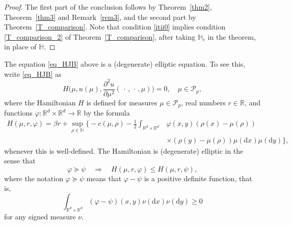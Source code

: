 \documentclass{article}
\theoremstyle{definition}
\newtheorem{remark}[theorem]{\textbf{Remark}}
\numberwithin{equation}{section}
\numberwithin{theorem}{section}
\newcommand{\R}{\mathbb{R}}
\newcommand{\dx}{\mathrm{d}x}
\newcommand{\dy}{\mathrm{d}y}
\newcommand{\Hb}{\mathbb{H}}
\newcommand{\Pcal}{{\mathcal P}}
\newcommand{\fdot}{{\,\cdot\,}}
\begin{document}
\begin{proof}
The first part of the conclusion follows by Theorem~\ref{thm2}, Theorem~\ref{thm3} and Remark~\ref{rem3}, and the second part by Theorem~\ref{T_comparison}. Note that condition \ref{itii0} implies condition \ref{T_comparison_2} of Theorem~\ref{T_comparison}, after taking $\Hb_c$ in the theorem, in place of $\Hb$.
\end{proof}



The equation \eqref{eq_HJB} above is a (degenerate) elliptic equation. To see this, write \eqref{eq_HJB} as
\[
H\Big(\mu,u(\mu),\frac{\partial^2 u}{\partial \mu^2}(\fdot,\fdot,\mu)\Big) = 0, \quad \mu\in\Pcal_p, 
\]
where the Hamiltonian $H$ is defined for measures $\mu\in\Pcal_p$, real numbers $r\in\R$, and functions $\varphi\colon {\R^d}\times {\R^d}\to\R$ by the formula
\begin{align*}
H(\mu,r,\varphi) = \beta r +  \sup_{\rho\in\Hb} \Big\{ - c(\mu,\rho) - \frac12 \int_{{\R^d}\times {\R^d}} & \varphi(x,y)(\rho(x) - \mu(\rho)) \\
&\times(\rho(y) - \mu(\rho)) \mu(\dx)\mu(\dy) \Big\},
\end{align*}
whenever this is well-defined. The Hamiltonian is (degenerate) elliptic in the sense that
\[
\varphi \succeq \psi \quad \Longrightarrow \quad H(\mu,r,\varphi) \le H(\mu,r,\psi),
\]
where the notation $\varphi \succeq \psi$ means that $\varphi-\psi$ is a positive definite function, that is,
\[
\int_{{\R^d}\times {\R^d}} (\varphi-\psi)(x,y) \nu(\dx)\nu(\dy) \ge 0
\]
for any signed measure $\nu$.
\end{document}

